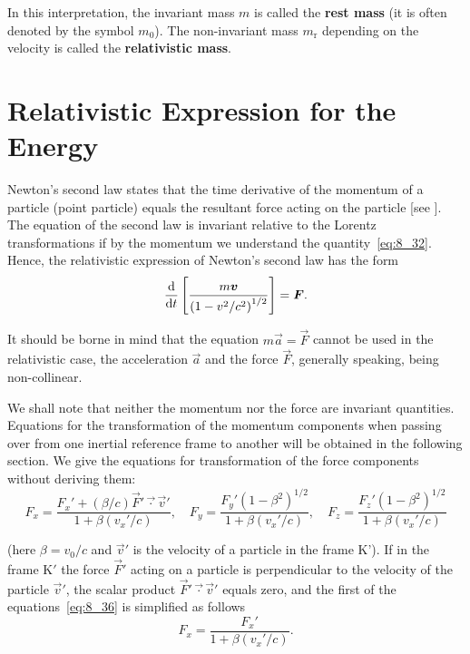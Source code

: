 \noindent
In this interpretation, the invariant mass $m$ is called the \textbf{rest mass} (it is often denoted by the symbol $m_0$). The non-invariant mass $m_{\text{r}}$ depending on the velocity is called the \textbf{relativistic mass}.

\section{Relativistic Expression for the Energy}\label{sec:8_7}

Newton's second law states that the time derivative of the momentum of a particle (point particle) equals the resultant force acting on the particle [see ]. The equation of the second law is invariant relative to the Lorentz transformations if by the momentum we understand the quantity~\eqref{eq:8_32}. Hence, the relativistic expression of Newton's second law has the form
\begin{equation}\label{eq:8_35}
	\frac{\mathrm{d}}{\mathrm{d} t}\left[\frac{m\boldsymbol{v}}{\left(1-v^2/c^2\right)^{1/2}}\right] = \boldsymbol{F}.
\end{equation}

It should be borne in mind that the equation $m\vec{a}=\vec{F}$ cannot be used in the relativistic case, the acceleration $\vec{a}$ and the force $\vec{F}$, generally speaking, being non-collinear.

We shall note that neither the momentum nor the force are invariant quantities. Equations for the transformation of the momentum components when passing over from one inertial reference frame to another will be obtained in the following section. We give the equations for transformation of the force components without deriving them:
\begin{equation}\label{eq:8_36}
	F_x = \frac{F_x' + (\beta/c)\vec{F}'\vec{\cdot}\vec{v}'}{1 + \beta(v_x'/c)},\quad F_y = \frac{F_y'\left(1-\beta^2\right)^{1/2}}{1 + \beta(v_x'/c)},\quad F_z = \frac{F_z'\left(1-\beta^2\right)^{1/2}}{1 + \beta(v_x'/c)}
\end{equation}

\noindent
(here $\beta=v_0/c$ and $\vec{v}'$ is the velocity of a particle in the frame K'). If in the frame K$'$ the force $\vec{F}'$ acting on a particle is perpendicular to the velocity of the particle $\vec{v}'$, the scalar product $\vec{F}'\vec{\cdot}\vec{v}'$ equals zero, and the first of the equations~\eqref{eq:8_36} is simplified as follows
\begin{equation}\label{eq:8_37}
	F_x = \frac{F_x'}{1 + \beta(v_x'/c)}.
\end{equation}

